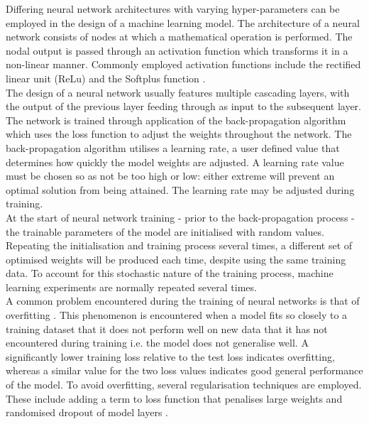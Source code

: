 \noindent
Differing neural network architectures with varying hyper-parameters \cite{gurney1997introduction} can be employed in the design of a machine learning model. The architecture of a neural network consists of nodes at which a mathematical operation is performed. The nodal output is passed through an activation function which transforms it in a non-linear manner. Commonly employed activation functions include the rectified linear unit (ReLu) \cite{hara2015analysis} and the Softplus function \cite{zheng2015improving}. 
\\

\noindent
The design of a neural network usually features multiple cascading layers, with the output of the previous layer feeding through as input to the subsequent layer. The network is trained through application of the back-propagation algorithm \cite{hecht1992theory} which uses the loss function to adjust the weights throughout the network. The back-propagation algorithm utilises a learning rate, a user defined value that determines how quickly the model weights are adjusted. A learning rate value must be chosen so as not be too high or low: either extreme will prevent an optimal solution from being attained. The learning rate may be adjusted during training. 
\\

\noindent
At the start of neural network training - prior to the back-propagation process - the trainable parameters of the model are initialised with random values. Repeating the initialisation and training process several times, a different set of optimised weights will be produced each time, despite using the same training data. To account for this stochastic nature of the training process, machine learning experiments are normally repeated several times.
\\

\noindent
A common problem encountered during the training of neural networks is that of overfitting \cite{hawkins2004problem}. This phenomenon is encountered when a model fits so closely to a training dataset that it does not perform well on new data that it has not encountered during training i.e. the model does not generalise well. A significantly lower training loss relative to the test loss indicates overfitting, whereas a similar value for the two loss values indicates good general performance of the model. To avoid overfitting, several regularisation techniques are employed. These include adding a term to loss function that penalises large weights and randomised dropout of model layers \cite{srivastava2014dropout}. 
\\

